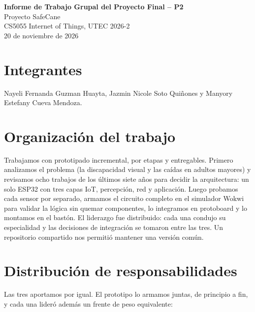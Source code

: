 \documentclass[12pt,a4paper]{article}
\begin{document}
\begin{center}
{\large\bfseries Informe de Trabajo Grupal del Proyecto Final -- P2}\\[0.4ex]
Proyecto SafeCane\\
CS5055 Internet of Things, UTEC 2026-2\\
20 de noviembre de 2026
\end{center}

\section{Integrantes}
Nayeli Fernanda Guzman Huayta, Jazmin Nicole Soto Quiñones y Manyory Estefany Cueva Mendoza.

\section{Organización del trabajo}
Trabajamos con prototipado incremental, por etapas y entregables. Primero analizamos el problema (la discapacidad visual y las caídas en adultos mayores) y revisamos ocho trabajos de los últimos siete años para decidir la arquitectura: un solo ESP32 con tres capas IoT, percepción, red y aplicación. Luego probamos cada sensor por separado, armamos el circuito completo en el simulador Wokwi para validar la lógica sin quemar componentes, lo integramos en protoboard y lo montamos en el bastón. El liderazgo fue distribuido: cada una condujo su especialidad y las decisiones de integración se tomaron entre las tres. Un repositorio compartido nos permitió mantener una versión común.

\section{Distribución de responsabilidades}
Las tres aportamos por igual. El prototipo lo armamos juntas, de principio a fin, y cada una lideró además un frente de peso equivalente:
\end{document}
